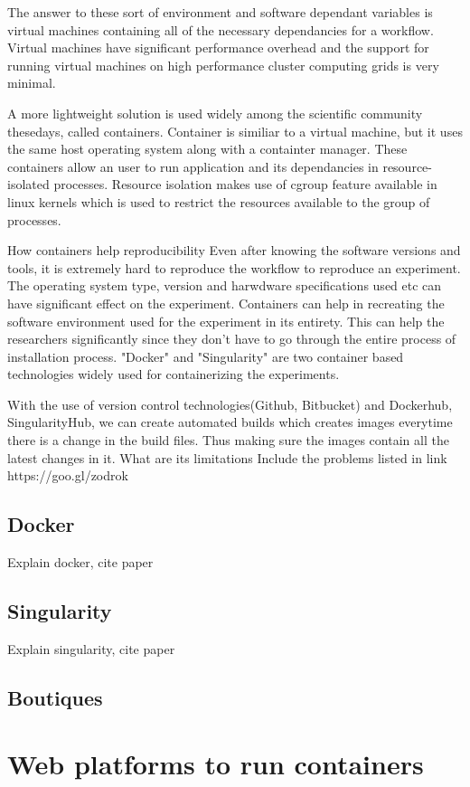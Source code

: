 The answer to these sort of environment and software dependant variables is virtual machines containing all of the necessary dependancies for a workflow. Virtual machines have significant performance overhead and the support for running virtual machines on high performance cluster computing grids is very minimal.

A more lightweight solution is used widely among the scientific community thesedays, called containers. Container is similiar to a virtual machine, but it uses the same host operating system along with a containter manager. These containers allow an user to run application and its dependancies in resource-isolated processes. Resource isolation makes use of cgroup feature available in linux kernels which is used to restrict the resources available to the group of processes.

How containers help reproducibility
Even after knowing the software versions and tools, it is extremely hard to reproduce the workflow to reproduce an experiment. The operating system type, version and harwdware specifications used etc can have significant effect on the experiment. Containers can help in recreating the software environment used for the experiment in its entirety. This can help the researchers significantly since they don't have to go through the entire process of installation process. "Docker" and "Singularity" are two container based technologies widely used for containerizing the experiments.

With the use of version control technologies(Github, Bitbucket) and Dockerhub, SingularityHub, we can create automated builds which creates images everytime there is a change in the build files. Thus making sure the images contain all the latest changes in it. 
What are its limitations
Include the problems listed in link https://goo.gl/zodrok
\subsection{Docker}
Explain docker, cite paper
\subsection{Singularity}
Explain singularity, cite paper
\subsection{Boutiques}

\section{Web platforms to run containers}

